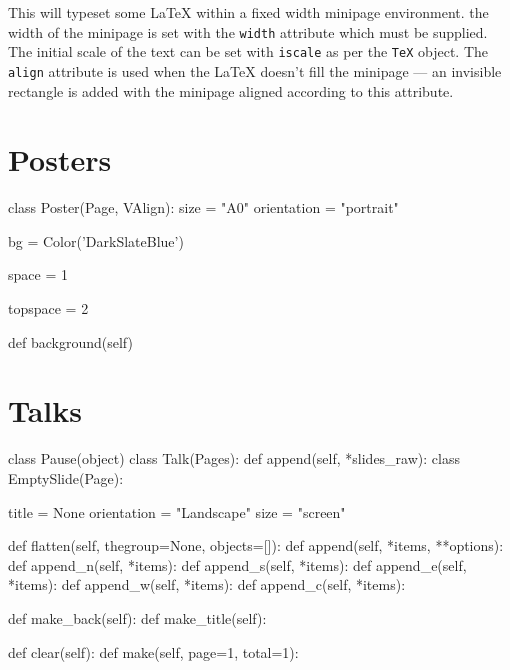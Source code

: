 This will typeset some \LaTeX{} within a fixed width minipage environment.
the width of the minipage is set with the \Verb|width| attribute which must
be supplied. The initial scale of the text can be set with \Verb|iscale| as
per the \Verb|TeX| object. The \Verb|align| attribute is used when the
\LaTeX{} doesn't fill the minipage --- an invisible rectangle is added with
the minipage aligned according to this attribute.

\section{Posters}

\begin{python}
class Poster(Page, VAlign):
    size = "A0"
    orientation = "portrait"

    bg = Color('DarkSlateBlue')

    space = 1

    topspace = 2
	
    def background(self)
\end{python}


\section{Talks}


\begin{python}
class Pause(object)
class Talk(Pages):
    def append(self, *slides_raw):
class EmptySlide(Page):

    title = None
    orientation = "Landscape"
    size = "screen"

    def flatten(self, thegroup=None, objects=[]):
    def append(self, *items, **options):
    def append_n(self, *items):
    def append_s(self, *items):
    def append_e(self, *items):
    def append_w(self, *items):
    def append_c(self, *items):

    def make_back(self):
    def make_title(self):

	def clear(self):
    def make(self, page=1, total=1):
\end{python}

